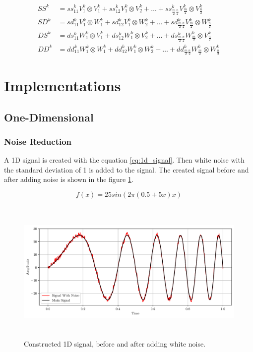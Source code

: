 \documentclass[12pt]{article}
\begin{document}
	\begin{equation}
		\begin{aligned}
		SS^k &= ss_{11}^k V_1^k \otimes V_1^k + ss_{12}^k V_1^k \otimes V_2^k + \dots + ss_{\frac{m}{2}\frac{n}{2}}^k V_{\frac{m}{2}}^k \otimes V_{\frac{n}{2}}^k \\
		SD^k &= sd_{11}^k V_1^k \otimes W_1^k + sd_{12}^k V_1^k \otimes W_2^k + \dots + sd_{\frac{m}{2}\frac{n}{2}}^k V_{\frac{m}{2}}^k \otimes W_{\frac{n}{2}}^k \\
		DS^k &= ds_{11}^k W_1^k \otimes V_1^k + ds_{12}^k W_1^k \otimes V_2^k + \dots + ds_{\frac{m}{2}\frac{n}{2}}^k W_{\frac{m}{2}}^k \otimes V_{\frac{n}{2}}^k \\
		DD^k &= dd_{11}^k W_1^k \otimes W_1^k + dd_{12}^k W_1^k \otimes W_2^k + \dots + dd_{\frac{m}{2}\frac{n}{2}}^k W_{\frac{m}{2}}^k \otimes W_{\frac{n}{2}}^k
		\end{aligned}
		\label{eq:2d_parts_n}
	\end{equation}
	
	\section{Implementations}
	
	\subsection{One-Dimensional}
	
	\subsubsection{Noise Reduction}
	
	A 1D signal is created with the equation \ref{eq:1d_signal}. Then white noise with the standard deviation of 1 is added to the signal. The created signal before and after adding noise is shown in the figure \ref{fig:1d_signal}.
	
	\begin{equation}
		f(x) = 25sin(2\pi(0.5 +5x)x)
		\label{eq:1d_signal}
	\end{equation}
	
	\begin{figure}[!h]
		\centering
		\includegraphics[height=7cm]{../Tests/Outputs/1D_Signal.pdf}
		\caption{Constructed 1D signal, before and after adding white noise.}
		\label{fig:1d_signal}
	\end{figure}
	
\end{document}
